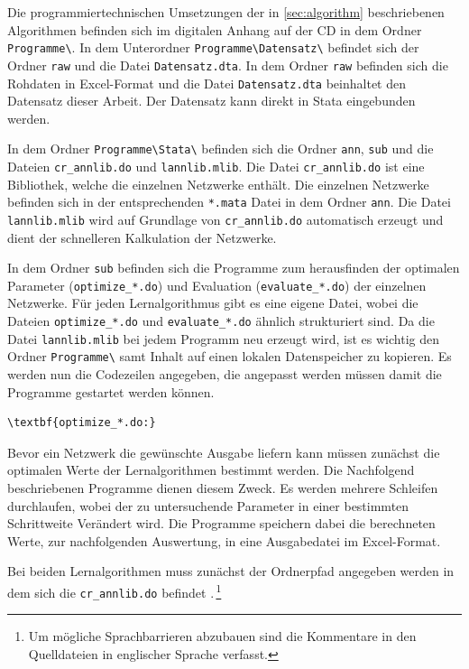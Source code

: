 Die programmiertechnischen Umsetzungen der in \autoref{sec:algorithm} beschriebenen Algorithmen befinden sich im digitalen Anhang auf der CD in dem Ordner \verb|Programme\|. In dem Unterordner \verb|Programme\Datensatz\| befindet sich der Ordner \verb|raw| und die Datei \verb|Datensatz.dta|. In dem Ordner \verb|raw| befinden sich die Rohdaten in Excel-Format und die Datei \verb|Datensatz.dta| beinhaltet den Datensatz dieser Arbeit. Der Datensatz kann direkt in Stata eingebunden werden.
\begin{sloppypar}
In dem Ordner \verb|Programme\Stata\| befinden sich die Ordner \verb|ann|, \verb|sub| und die Dateien \verb|cr_annlib.do| und \verb|lannlib.mlib|. Die Datei \verb|cr_annlib.do| ist eine Bibliothek, welche die einzelnen Netzwerke enthält. Die einzelnen Netzwerke befinden sich in der entsprechenden \verb|*.mata| Datei in dem Ordner \verb|ann|. Die Datei \verb|lannlib.mlib| wird auf Grundlage von \verb|cr_annlib.do| automatisch erzeugt und dient der schnelleren Kalkulation der Netzwerke.
\end{sloppypar}
In dem Ordner \verb|sub| befinden sich die Programme zum herausfinden der optimalen Parameter (\verb|optimize_*.do|) und Evaluation (\verb|evaluate_*.do|) der einzelnen Netzwerke.
Für jeden Lernalgorithmus gibt es eine eigene Datei, wobei die Dateien \verb|optimize_*.do| und \verb|evaluate_*.do| ähnlich strukturiert sind. Da die Datei \verb|lannlib.mlib| bei jedem Programm neu erzeugt wird, ist es wichtig den Ordner \verb|Programme\| samt Inhalt auf einen lokalen Datenspeicher zu kopieren. 
Es werden nun die Codezeilen angegeben, die angepasst werden müssen damit die Programme gestartet werden können.\\

\begin{Verbatim}[commandchars=\\\{\}]
\textbf{optimize_*.do:}
\end{Verbatim}
Bevor ein Netzwerk die gewünschte Ausgabe liefern kann müssen zunächst die optimalen Werte der Lernalgorithmen bestimmt werden. Die Nachfolgend beschriebenen Programme dienen diesem Zweck. Es werden mehrere Schleifen durchlaufen, wobei der zu untersuchende Parameter in einer bestimmten Schrittweite Verändert wird. Die Programme speichern dabei die berechneten Werte, zur nachfolgenden Auswertung, in eine Ausgabedatei im Excel-Format.

Bei beiden Lernalgorithmen muss zunächst der Ordnerpfad angegeben werden in dem sich die \verb|cr_annlib.do| befindet .\,\footnote{Um mögliche Sprachbarrieren abzubauen sind die Kommentare in den Quelldateien in englischer Sprache verfasst.}

